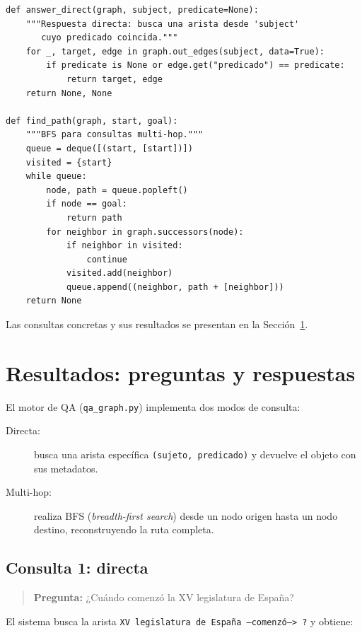 \documentclass[12pt,a4paper]{article}
\begin{document}
\begin{lstlisting}[caption={qa\_graph.py --- funciones principales de consulta}, label={lst:qa}]
def answer_direct(graph, subject, predicate=None):
    """Respuesta directa: busca una arista desde 'subject'
       cuyo predicado coincida."""
    for _, target, edge in graph.out_edges(subject, data=True):
        if predicate is None or edge.get("predicado") == predicate:
            return target, edge
    return None, None

def find_path(graph, start, goal):
    """BFS para consultas multi-hop."""
    queue = deque([(start, [start])])
    visited = {start}
    while queue:
        node, path = queue.popleft()
        if node == goal:
            return path
        for neighbor in graph.successors(node):
            if neighbor in visited:
                continue
            visited.add(neighbor)
            queue.append((neighbor, path + [neighbor]))
    return None
\end{lstlisting}

Las consultas concretas y sus resultados se presentan en la Sección~\ref{sec:qa}.

\section{Resultados: preguntas y respuestas}
\label{sec:qa}

El motor de QA (\texttt{qa\_graph.py}) implementa dos modos de consulta:

\begin{description}
  \item[Directa:] busca una arista específica \texttt{(sujeto, predicado)} y devuelve el objeto con sus metadatos.
  \item[Multi-hop:] realiza BFS (\textit{breadth-first search}) desde un nodo origen hasta un nodo destino, reconstruyendo la ruta completa.
\end{description}

\subsection{Consulta 1: directa}
\label{q1}

\begin{quote}
\textbf{Pregunta:} ¿Cuándo comenzó la XV legislatura de España?
\end{quote}

El sistema busca la arista \texttt{XV legislatura de España --comenzó--> ?} y obtiene:
\end{document}

